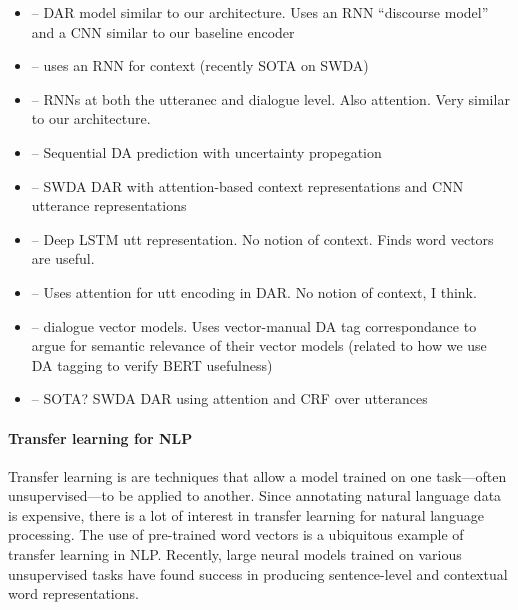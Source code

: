 \documentclass[11pt,a4paper]{article}
\begin{document}
\begin{itemize}
  \item \citet{kalchbrennerRecurrentConvolutionalNeural2013} -- DAR model similar to our architecture. Uses an RNN ``discourse model'' and a CNN similar to our baseline encoder
  \item \citet{botheContextbasedApproachDialogue2018} -- uses an RNN for context (recently SOTA on SWDA)
  \item \citet{tranHierarchicalNeuralModel2017} -- RNNs at both the utteranec and dialogue level. Also attention. Very similar to our architecture.
  \item \citet{tranPreservingDistributionalInformation2017} -- Sequential DA prediction with uncertainty propegation
  \item \citet{ortegaNeuralbasedContextRepresentation2017} -- SWDA DAR with attention-based context representations and CNN utterance representations
  \item \citet{khanpourDialogueActClassification2016} -- Deep LSTM utt representation. No notion of context. Finds word vectors are useful.
  \item \citet{shenNeuralAttentionModels2016} -- Uses attention for utt encoding in DAR. No notion of context, I think.
  \item \citet{pragstVectorRepresentationUtterances2018} -- dialogue vector models. Uses vector-manual DA tag correspondance to argue for semantic relevance of their vector models (related to how we use DA tagging to verify BERT usefulness)
  \item \citet{chenDialogueActRecognition2017} -- SOTA? SWDA DAR using attention and CRF over utterances
\end{itemize}

\paragraph{Transfer learning for NLP}
Transfer learning is are techniques that allow a model trained on one task---often unsupervised---to be applied to another. 
Since annotating natural language data is expensive, there is a lot of interest in transfer learning for natural language processing. 
The use of pre-trained word vectors \citep[e.g.,][]{mikolovDistributedRepresentationsWords2013;penningtonGloveGlobalVectors2014} is a ubiquitous example of transfer learning in NLP.
Recently, large neural models trained on various unsupervised tasks have found success in producing sentence-level and contextual word representations. 
\end{document}
